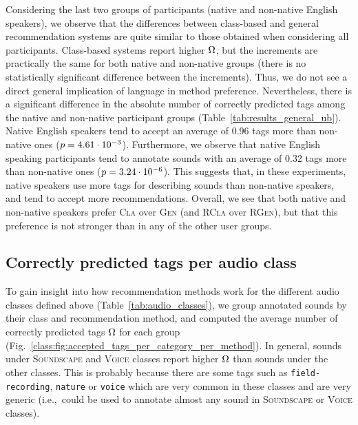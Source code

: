 Considering the last two groups of participants (native and non-native English speakers), we observe that the differences between class-based and general recommendation systems are quite similar to those obtained when considering all participants. Class-based systems report higher $\Omega$, but the increments are practically the same for both native and non-native groups (there is no statistically significant difference between the increments). Thus, we do not see a direct general implication of language in method preference. Nevertheless, there is a significant difference in the absolute number of correctly predicted tags among the native and non-native participant groups (Table~\ref{tab:results_general_ub}). Native English speakers tend to accept an average of 0.96 tags more than non-native ones ($p = 4.61\cdot 10^{-3}$). Furthermore, we observe that native English speaking participants tend to annotate sounds with an average of 0.32 tags more than non-native ones ($p = 3.24\cdot 10^{-6}$). This suggests that, in these experiments, native speakers use more tags for describing sounds than non-native speakers, and tend to accept more recommendations.  
Overall, we see that both native and non-native speakers prefer \textsc{Cla} over \textsc{Gen} (and \textsc{RCla} over \textsc{RGen}), but that this preference is not stronger than in any of the other user groups.

\subsection{Correctly predicted tags per audio class}
\label{class:sec:accepted_tags_audio_class_results}

To gain insight into how recommendation methods work for the different audio classes defined above (Table~\ref{tab:audio_classes}), we group annotated sounds by their class and recommendation method, and computed the average number of correctly predicted tags $\Omega$ for each group (Fig.~\ref{class:fig:accepted_tags_per_category_per_method}). In general, sounds under \textsc{Soundscape} and \textsc{Voice} classes report higher $\Omega$ than sounds under the other classes. This is probably because there are some tags such as \texttt{field-recording}, \texttt{nature} or \texttt{voice} which are very common in these classes and are very generic (i.e.,~could be used to annotate almost any sound in \textsc{Soundscape} or \textsc{Voice} classes). 

